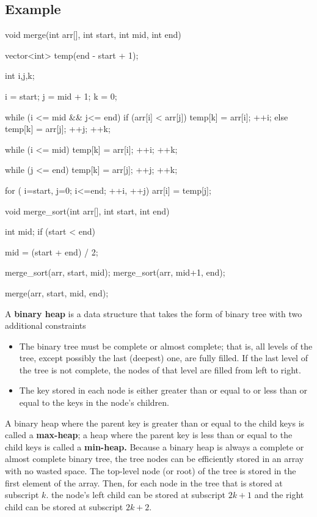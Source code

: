 \documentclass{report}
\begin{document}
    \bigbreak \noindent 
    \subsection{Example}
    \bigbreak \noindent 
    \begin{cppcode}
void merge(int arr[], int start, int mid, int end) {

    vector<int> temp(end - start + 1);

    int i,j,k;

    i = start;
    j = mid + 1;
    k = 0;

    while (i <= mid && j<= end) {
        if (arr[i] < arr[j]) {
            temp[k] = arr[i];
            ++i;
        } else {
            temp[k] = arr[j];
            ++j;
        }
        ++k;
    }

    while (i <= mid) {
        temp[k] = arr[i];
        ++i;
        ++k;
    }

    while (j <= end) {
        temp[k] = arr[j];
        ++j;
        ++k;
    }

    for ( i=start, j=0; i<=end; ++i, ++j) {
        arr[i] = temp[j];
    }
}

void merge_sort(int arr[], int start, int end) {

    int mid;
    if (start < end) {
        mid = (start + end) / 2;

        merge_sort(arr, start, mid);
        merge_sort(arr, mid+1, end);

        merge(arr, start, mid, end);
    }
}
    \end{cppcode}

    \pagebreak 
    \bigbreak \noindent 
    \begin{concept}
        A \textbf{binary heap} is a data structure that takes the form of binary tree with two additional constraints
        \begin{itemize}
            \item The binary tree must be complete or almost complete; that is, all levels of the tree, except possibly the last (deepest) one, are fully filled. If the last level of the tree is not complete, the nodes of that level are filled from left to right.
            \item The key stored in each node is either greater than or equal to or less than or equal to the keys in the node’s children.
        \end{itemize}
    \end{concept}
    \bigbreak \noindent 
    A binary heap where the parent key is greater than or equal to the child keys is called a \textbf{max-heap}; a heap where the parent key is less than or equal to  the child keys is called a \textbf{min-heap.}
    \bigbreak \noindent 
    Because a binary heap is always a complete or almost complete binary tree, the tree nodes can be efficiently stored in an array with no wasted space. The top-level node (or root) of the tree is stored in the first element of the array. Then, for each node in the tree that is stored at subscript $k$. the node's left child can be stored at subscript $2k+1$ and the right child can be stored at subscript $2k+2 $.
    \bigbreak \noindent 
\end{document}
